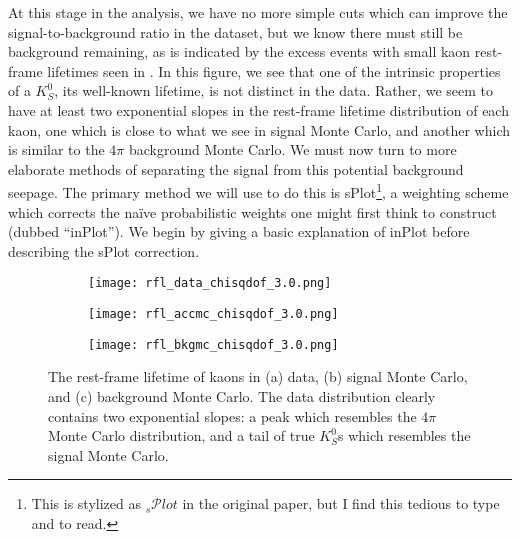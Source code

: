 At this stage in the analysis, we have no more simple cuts which can improve the signal-to-background ratio in the dataset, but we know there must still be background remaining, as is indicated by the excess events with small kaon rest-frame lifetimes seen in . In this figure, we see that one of the intrinsic properties of a $K_S^0$, its well-known lifetime, is not distinct in the data. Rather, we seem to have at least two exponential slopes in the rest-frame lifetime distribution of each kaon, one which is close to what we see in signal Monte Carlo, and another which is similar to the $4\pi$ background Monte Carlo. We must now turn to more elaborate methods of separating the signal from this potential background seepage. The primary method we will use to do this is sPlot\cite{pivk_splot_2005}\footnote{This is stylized as ${}_s\mathcal{P}lot$ in the original paper, but I find this tedious to type and to read.}, a weighting scheme which corrects the na\"ive probabilistic weights one might first think to construct (dubbed ``inPlot''). We begin by giving a basic explanation of inPlot before describing the sPlot correction.

\begin{figure}
  \begin{center}
    \begin{subfigure}[b]{.7\columnwidth}
      \texttt{[image: rfl\_data\_chisqdof\_3.0.png]}
      \caption{}
      \label{fig:rfl-data}
    \end{subfigure}
    \begin{subfigure}[b]{.7\columnwidth}
      \texttt{[image: rfl\_accmc\_chisqdof\_3.0.png]}
      \caption{}
      \label{fig:rfl-accmc}
    \end{subfigure}
    \begin{subfigure}[b]{.7\columnwidth}
      \texttt{[image: rfl\_bkgmc\_chisqdof\_3.0.png]}
      \caption{}
      \label{fig:rfl-bkgmc}
    \end{subfigure}
  \end{center}
  \caption{The rest-frame lifetime of kaons in (a) data, (b) signal Monte Carlo, and (c) background Monte Carlo. The data distribution clearly contains two exponential slopes: a peak which resembles the $4\pi$ Monte Carlo distribution, and a tail of true $K_S^0$s which resembles the signal Monte Carlo.}\label{fig:rfl-pre-splot}
\end{figure}

